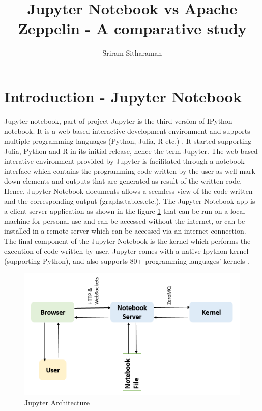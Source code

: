 \documentclass[9pt,twocolumn,twoside]{../../styles/osajnl}
\title{Jupyter Notebook vs Apache Zeppelin - A comparative study}
\author[1,*]{Sriram Sitharaman}
\affil[1]{School of Informatics and Computing, Bloomington, IN 47408, U.S.A.}
\affil[*]{Corresponding authors: srirsith@iu.edu}
\begin{document}
\maketitle
\tableofcontents %
\section{Introduction - Jupyter Notebook}
Jupyter notebook, part of project Jupyter is the third version of IPython notebook. It is a web based interactive development environment and supports multiple programming languages (Python, Julia, R etc.) \cite{www-jupyter-wiki}. It started supporting Julia, Python and R in its initial release, hence the term Jupyter. The web based interative environment provided by Jupyter is facilitated through a notebook interface which contains the programming code written by the user as well mark down elements and outputs that are generated as result of the written code\cite{www-jupyter-notebook}. Hence, Jupyter Notebook documents allows a seemless view of the code written and the corresponding output (graphs,tables,etc.). The Jupyter Notebook app is a client-server application as shown in the figure \ref{fig:arch} that can be run on a local machine for personal use and can be accessed without the internet, or can be installed in a remote server which can be accessed via an internet connection. The final component of the Jupyter Notebook is the kernel which performs the execution of code written by user. Jupyter comes with a native Ipython kernel (supporting Python), and also supports 80+ programming languages' kernels \cite{www-jupyter-kernel}.
\begin{figure}[h]
\begin{center}
\includegraphics[width =\linewidth,height=2.5in]{images/JupyterNotebook}
\caption{Jupyter Architecture \cite{www-jupyter-arch}}
\label{fig:arch}
\end{center}
\end{figure}
\end{document}
